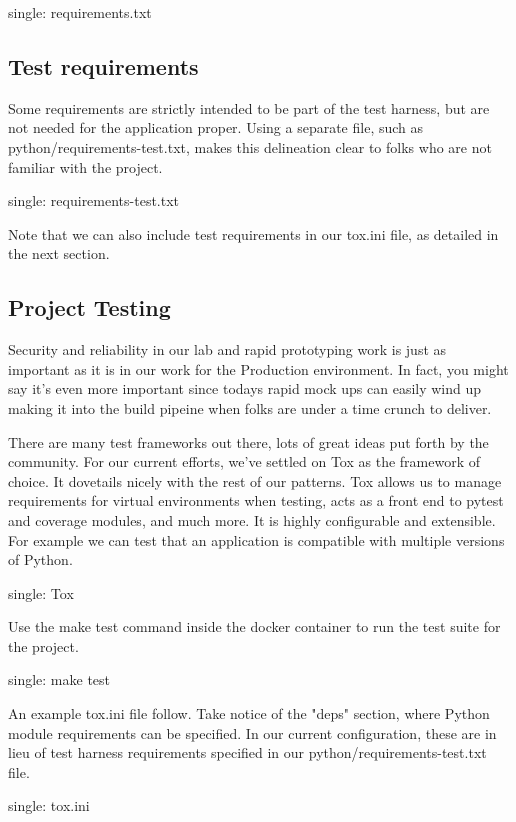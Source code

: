 single: requirements.txt

\hypertarget{test-requirements}{%
\subsection{Test requirements}\label{test-requirements}}

Some requirements are strictly intended to be part of the test harness,
but are not needed for the application proper. Using a separate file,
such as python/requirements-test.txt, makes this delineation clear to
folks who are not familiar with the project.

single: requirements-test.txt

Note that we can also include test requirements in our tox.ini file, as
detailed in the next section.

\hypertarget{project-testing}{%
\subsection{Project Testing}\label{project-testing}}

Security and reliability in our lab and rapid prototyping work is just
as important as it is in our work for the Production environment. In
fact, you might say it's even more important since todays rapid mock ups
can easily wind up making it into the build pipeine when folks are under
a time crunch to deliver.

There are many test frameworks out there, lots of great ideas put forth
by the community. For our current efforts, we've settled on Tox as the
framework of choice. It dovetails nicely with the rest of our patterns.
Tox allows us to manage requirements for virtual environments when
testing, acts as a front end to pytest and coverage modules, and much
more. It is highly configurable and extensible. For example we can test
that an application is compatible with multiple versions of Python.

single: Tox

Use the make test command inside the docker container to run the test
suite for the project.

single: make test

An example tox.ini file follow. Take notice of the "deps" section, where
Python module requirements can be specified. In our current
configuration, these are in lieu of test harness requirements specified
in our python/requirements-test.txt file.

single: tox.ini

